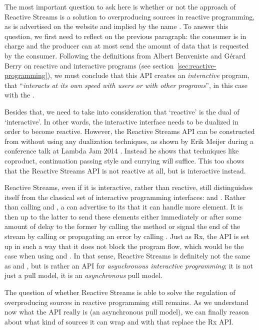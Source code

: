 The most important question to ask here is whether or not the approach of Reactive Streams is a solution to overproducing sources in reactive programming, as is advertised on the website and implied by the name \cite{Reactive-Streams}. To answer this question, we first need to reflect on the previous paragraph: the consumer is in charge and the producer can at most send the amount of data that is requested by the consumer. Following the definitions from Albert Benveniste and G\'erard Berry \cite{berry1991-Reactive} on reactive and interactive programs (see section~\ref{sec:reactive-programming}), we must conclude that this API creates an \emph{interactive} program, that ``\textit{interacts at its own speed with users or with other programs}'', in this case with the .

Besides that, we need to take into consideration that `reactive' is the dual of `interactive'. In other words, the interactive interface needs to be dualized in order to become reactive. However, the Reactive Streams API can be constructed from \ieb without using any dualization techniques, as shown by Erik Meijer during a conference talk at Lambda Jam 2014 \cite{meijer2014-Derivation}. Instead he shows that techniques like coproduct, continuation passing style and currying will suffice. This too shows that the Reactive Streams API is not reactive at all, but is interactive instead.

Reactive Streams, even if it is interactive, rather than reactive, still distinguishes itself from the classical set of interactive programming interfaces: \ieb and \ier. Rather than calling  and , a  can advertise to its  that it can handle  more element. It is then up to the latter to send these elements either immediately or after some amount of delay to the former by calling the  method or signal the end of the stream by calling  or propagating an error by calling . Just as Rx, the API is set up in such a way that it does not block the program flow, which would be the case when using \ieb and \ier. In that sense, Reactive Streams is definitely not the same as \ieb and \ier, but is rather an API for \textit{asynchronous interactive programming}; it is not just a pull model, it is an \textit{asynchronous} pull model.

The question of whether Reactive Streams is able to solve the regulation of overproducing sources in reactive programming still remains. As we understand now what the API really is (an asynchronous pull model), we can finally reason about what kind of sources it can wrap and with that replace the Rx API.

